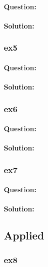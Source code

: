 \documentclass[a4paper,12pt,titlepage]{article} %
\begin{document}
\paragraph{Question:}

\paragraph{Solution:}

\subsubsection{ex5}
\paragraph{Question:}

\paragraph{Solution:}

\subsubsection{ex6}
\paragraph{Question:}

\paragraph{Solution:}

\subsubsection{ex7}
\paragraph{Question:}

\paragraph{Solution:}


\subsection{Applied}
\subsubsection{ex8}
\end{document}
